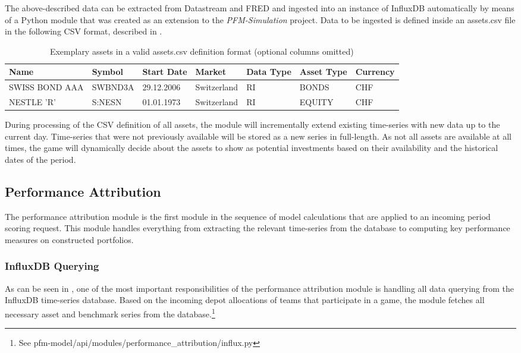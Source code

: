 The above-described data can be extracted from Datastream and FRED and ingested into an instance of InfluxDB automatically by means of a Python module that was created as an extension to the \textit{PFM-Simulation} project. Data to be ingested is defined inside an assets.csv file in the following CSV format, described in .\\

\begin{table}[h!]
    \begin{tabular}{lllllll}
        \toprule
        Name           & Symbol  & Start Date & Market      & Data Type & Asset Type & Currency \\
        \midrule
        SWISS BOND AAA & SWBND3A & 29.12.2006 & Switzerland & RI        & BONDS      & CHF      \\
        NESTLE 'R'     & S:NESN  & 01.01.1973 & Switzerland & RI        & EQUITY     & CHF      \\
        \bottomrule
    \end{tabular}
    \centering
    \caption{Exemplary assets in a valid assets.csv definition format (optional columns omitted)}
    \label{table:assets_csv}
\end{table}

During processing of the CSV definition of all assets, the module will incrementally extend existing time-series with new data up to the current day. Time-series that were not previously available will be stored as a new series in full-length. As not all assets are available at all times, the game will dynamically decide about the assets to show as potential investments based on their availability and the historical dates of the period.


\subsection{Performance Attribution}
The performance attribution module is the first module in the sequence of model calculations that are applied to an incoming period scoring request. This module handles everything from extracting the relevant time-series from the database to computing key performance measures on constructed portfolios.

\subsubsection{InfluxDB Querying}
As can be seen in , one of the most important responsibilities of the performance attribution module is handling all data querying from the InfluxDB time-series database. Based on the incoming depot allocations of teams that participate in a game, the module fetches all necessary asset and benchmark series from the database.\footnote{See pfm-model/api/modules/performance\_attribution/influx.py}

